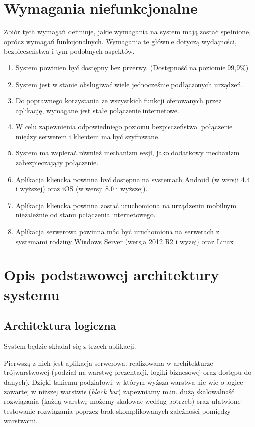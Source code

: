 \section{Wymagania niefunkcjonalne}
Zbiór tych wymagań definiuje, jakie wymagania na system mają zostać spełnione, oprócz wymagań funkcjonalnych. Wymagania te głównie dotyczą wydajności, bezpieczeństwa i tym podobnych aspektów.
\begin{enumerate}
\item System powinien być dostępny bez przerwy. (Dostępność na poziomie 99,9\%)
\item System jest w stanie obsługiwać wiele jednocześnie podłączonych urządzeń.
\item Do poprawnego korzystania ze wszystkich funkcji oferowanych przez aplikację, wymagane jest stałe połączenie internetowe.
\item W celu zapewnienia odpowiedniego poziomu bezpieczeństwa, połączenie między serwerem i klientem ma być szyfrowane.
\item System ma wspierać również mechanizm sesji, jako dodatkowy mechanizm zabezpieczający połączenie.
\item Aplikacja kliencka powinna być dostępna na systemach Android (w wersji 4.4 i wyższej) oraz iOS (w wersji 8.0 i wyższej).
\item Aplikacja kliencka powinna zostać uruchomiona na urządzeniu mobilnym niezależnie od stanu połączenia internetowego.
\item Aplikacja serwerowa powinna móc być uruchomiona na serwerach z systemami rodziny Windows Server (wersja 2012 R2 i wyżej) oraz Linux

\end{enumerate}
\section{Opis podstawowej architektury systemu}
\subsection*{Architektura logiczna}
System będzie składał się z trzech aplikacji. 

\par Pierwszą z nich jest aplikacja serwerowa, realizowana w architekturze trójwarstwowej (podział na warstwę prezentacji, logiki biznesowej oraz dostępu do danych). Dzięki takiemu podziałowi, w którym wyższa warstwa nie wie o logice zawartej w niższej warstwie (\textit{black box}) zapewniamy m.in. dużą skalowalność rozwiązania (każdą warstwę możemy skalować według potrzeb) oraz ułatwione testowanie rozwiązania poprzez brak skomplikowanych zależności pomiędzy warstwami.

